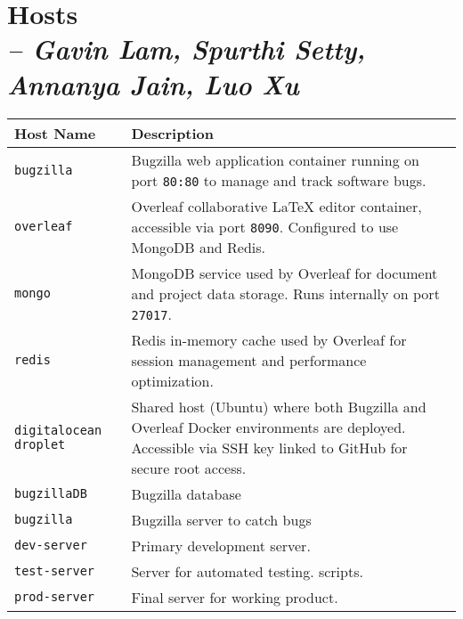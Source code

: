 \chapter{Hosts \\
\small{\textit{-- Gavin Lam, Spurthi Setty, Annanya Jain, Luo Xu}}
\label{Chapter::Hosts}}

\begin{longtable}{|p{5cm}|p{10cm}|}
\hline
\textbf{Host Name} & \textbf{Description} \\ \hline
\texttt{bugzilla} & Bugzilla web application container running on port \texttt{80:80} to manage and track software bugs. \\ 
\hline

\texttt{overleaf} & Overleaf collaborative LaTeX editor container, accessible via port \texttt{8090}. Configured to use MongoDB and Redis. \\ 
\hline

\texttt{mongo} & MongoDB service used by Overleaf for document and project data storage. Runs internally on port \texttt{27017}. \\ 
\hline

\texttt{redis} & Redis in-memory cache used by Overleaf for session management and performance optimization. \\ 
\hline

\texttt{digitalocean droplet} & Shared host (Ubuntu) where both Bugzilla and Overleaf Docker environments are deployed. Accessible via SSH key linked to GitHub for secure root access. \\ 
\hline

\texttt{bugzillaDB} & Bugzilla database \\ \hline
\texttt{bugzilla} & Bugzilla server to catch bugs \\ \hline
\texttt{dev-server} & Primary development server. \\ \hline
\texttt{test-server} & Server for automated testing. 
scripts. \\ \hline
\texttt{prod-server} & Final server for working product. \\ \hline
\end{longtable}